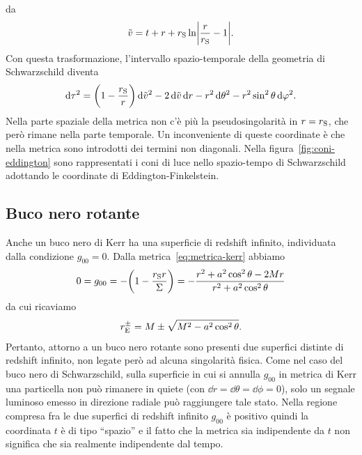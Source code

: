 da~\parencites{1924Natur.113..192E}{1958PhRv..110..965F}
\begin{equation}
  \tilde{v} = t + r + r_{\textup{S}} \ln\abs*{\frac{r}{r_{\textup{S}}} - 1}.
\end{equation}
Con questa trasformazione, l'intervallo spazio-temporale della geometria di
Schwarzschild diventa
\begin{equation}
  \mathop{}\!\mathrm{d}\tau^{2} = \biggl(1 - \frac{r_{\textup{S}}}{r}\biggr)\mathop{}\!\mathrm{d}\tilde{v}^{2} -
  2\mathop{}\!\mathrm{d}\tilde{v}\mathop{}\!\mathrm{d} r - r^{2}\mathop{}\!\mathrm{d}\theta^{2} - r^{2}\sin^{2}\theta\mathop{}\!\mathrm{d}\varphi^{2}.
\end{equation}
Nella parte spaziale della metrica non c'è più la pseudosingolarità in \(r =
r_{\textup{S}}\), che però rimane nella parte temporale.  Un inconveniente di
queste coordinate è che nella metrica sono introdotti dei termini non diagonali.
Nella figura~\ref{fig:coni-eddington} sono rappresentati i coni di luce nello
spazio-tempo di Schwarzschild adottando le coordinate di Eddington-Finkelstein.

\subsection{Buco nero rotante}
\label{sec:singolarita-kerr}

Anche un buco nero di Kerr ha una superficie di redshift infinito, individuata
dalla condizione \(g_{00} = 0\).  Dalla metrica~\eqref{eq:metrica-kerr} abbiamo
\begin{equation}
  0 = g_{00} = -\biggl(1 - \frac{r_{\textup{S}}r}{\Sigma}\biggr) = -\frac{r^{2}
    + a^{2}\cos^{2}\theta - 2 Mr}{r^{2} + a^{2}\cos^{2}\theta}
\end{equation}
da cui ricaviamo
\begin{equation}
  r_{\textup{E}}^{\pm} = M \pm \sqrt{M^{2} - a^{2}\cos^{2}\theta}.
\end{equation}
Pertanto, attorno a un buco nero rotante sono presenti due superfici distinte di
redshift infinito, non legate però ad alcuna singolarità fisica.  Come nel caso
del buco nero di Schwarzschild, sulla superficie in cui si annulla \(g_{00}\) in
metrica di Kerr una particella non può rimanere in quiete (con \(\dd r =
\dd\theta = \dd\phi = 0\)), solo un segnale luminoso emesso in direzione radiale
può raggiungere tale stato.  Nella regione compresa fra le due superfici di
redshift infinito \(g_{00}\) è positivo quindi la coordinata \(t\) è di tipo
``spazio'' e il fatto che la metrica sia indipendente da \(t\) non significa che
sia realmente indipendente dal tempo.

